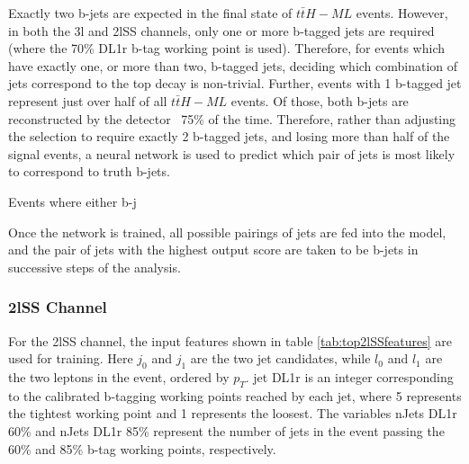 Exactly two b-jets are expected in the final state of $t\bar{t}H-ML$ events. However, in both the 3l and 2lSS channels, only one or more b-tagged jets are required (where the 70\% DL1r b-tag working point is used). Therefore, for events which have exactly one, or more than two, b-tagged jets, deciding which combination of jets correspond to the top decay is non-trivial. Further, events with 1 b-tagged jet represent just over half of all $t\bar{t}H-ML$ events. Of those, both b-jets are reconstructed by the detector ~75\% of the time. Therefore, rather than adjusting the selection to require exactly 2 b-tagged jets, and losing more than half of the signal events, a neural network is used to predict which pair of jets is most likely to correspond to truth b-jets.

Events where either b-j

Once the network is trained, all possible pairings of jets are fed into the model, and the pair of jets with the highest output score are taken to be b-jets in successive steps of the analysis. 

\subsubsection{2lSS Channel}
\label{subsec:top2lSS}

For the 2lSS channel, the input features shown in table \ref{tab:top2lSSfeatures} are used for training. Here $j_0$ and $j_1$ are the two jet candidates, while $l_0$ and $l_1$ are the two leptons in the event, ordered by $p_T$. jet DL1r is an integer corresponding to the calibrated b-tagging working points reached by each jet, where 5 represents the tightest working point and 1 represents the loosest. The variables nJets DL1r 60\% and nJets DL1r 85\% represent the number of jets in the event passing the 60\% and 85\% b-tag working points, respectively.

